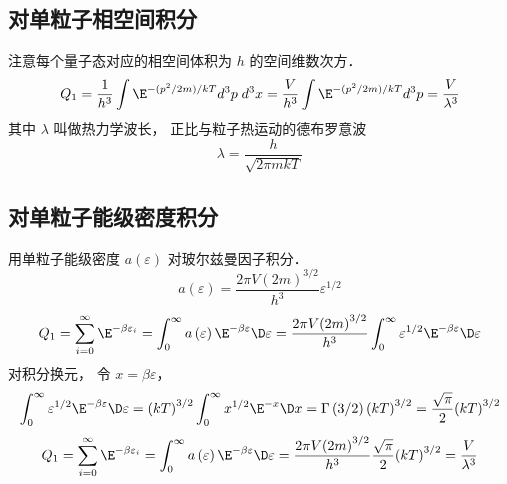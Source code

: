 \subsection{对单粒子相空间积分}
注意每个量子态对应的相空间体积为 $h$ 的空间维数次方．
\begin{equation}
{Q_1} = \frac{1}{{{h^3}}}\int {{\E^{ - ({p^2}/2m)/kT}}{d^3}p\;{d^3}x}  = \frac{V}{{{h^3}}}\int {{\E^{ - ({p^2}/2m)/kT}}{d^3}p}  = \frac{V}{{{\lambda ^3}}}
\end{equation}
其中 $\lambda $ 叫做热力学波长， 正比与粒子热运动的德布罗意波
\begin{equation}
\lambda  = \frac{h}{{\sqrt {2\pi mkT} }}
\end{equation}

\subsection{对单粒子能级密度积分}
用单粒子能级密度 $a\left( \varepsilon  \right)$ 对玻尔兹曼因子积分．
\begin{equation}
a\left( \varepsilon  \right) = \frac{{2\pi V{{\left( {2m} \right)}^{3/2}}}}{{{h^3}}}{\varepsilon ^{1/2}}
\end{equation}
\begin{equation}
{Q_1} = \sum\limits_{i = 0}^\infty  {{\E^{ - \beta {\varepsilon_i}}}}  = \int_0^\infty  {a\left( \varepsilon  \right){\E^{ - \beta \varepsilon }}\D \varepsilon }  \\
= \frac{{2\pi V{{\left( {2m} \right)}^{3/2}}}}{{{h^3}}}\int_0^\infty  {{\varepsilon ^{1/2}}{\E^{ - \beta \varepsilon }}\D \varepsilon }
\end{equation}
对积分换元， 令 $x = \beta \varepsilon $， 
\begin{equation}
\int_0^\infty  {{\varepsilon ^{1/2}}{\E^{ - \beta \varepsilon }}\D \varepsilon } = {\left( {kT} \right)^{3/2}}\int_0^\infty  {{x^{1/2}}{\E^{ - x}}\D x}
= \Gamma \left( {3/2} \right){\left( {kT} \right)^{3/2}}
= \frac{{\sqrt \pi  }}{2}{\left( {kT} \right)^{3/2}}
\end{equation}
\begin{equation}
{Q_1} = \sum\limits_{i = 0}^\infty  {{\E^{ - \beta {\varepsilon_i}}}}  = \int_0^\infty  {a\left( \varepsilon  \right){\E^{ - \beta \varepsilon }}\D\varepsilon } = \frac{{2\pi V{{\left( {2m} \right)}^{3/2}}}}{{{h^3}}}\frac{{\sqrt \pi  }}{2}{\left( {kT} \right)^{3/2}}  = \frac{V}{{{\lambda ^3}}}
\end{equation}

